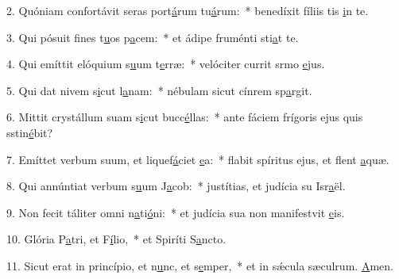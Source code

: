 2. Quóniam confortávit seras port\uline{á}rum tu\uline{á}rum:~* benedíxit fíliis tis \uline{i}n te.\par 
3. Qui pósuit fines t\uline{u}os p\uline{a}cem:~* et ádipe fruménti sti\uline{a}t te.\par 
4. Qui emíttit elóquium s\uline{u}um t\uline{e}rræ:~* velóciter currit srmo \uline{e}jus.\par 
5. Qui dat nivem s\uline{i}cut l\uline{a}nam:~* nébulam sicut cínrem sp\uline{a}rgit.\par 
6. Mittit crystállum suam s\uline{i}cut bucc\uline{é}llas:~* ante fáciem frígoris ejus quis sstin\uline{é}bit?\par 
7. Emíttet verbum suum, et liquef\uline{á}ciet \uline{e}a:~* flabit spíritus ejus, et flent \uline{a}quæ.\par 
8. Qui annúntiat verbum s\uline{u}um J\uline{a}cob:~* justítias, et judícia su Isr\uline{a}ël.\par 
9. Non fecit táliter omni n\uline{a}ti\uline{ó}ni:~* et judícia sua non manifestvit \uline{e}is.\par 
10. Glória P\uline{a}tri, et F\uline{í}lio,~* et Spiríti S\uline{a}ncto.\par 
11. Sicut erat in princípio, et n\uline{u}nc, et s\uline{e}mper,~* et in sǽcula sæculrum. \uline{A}men.\par 
